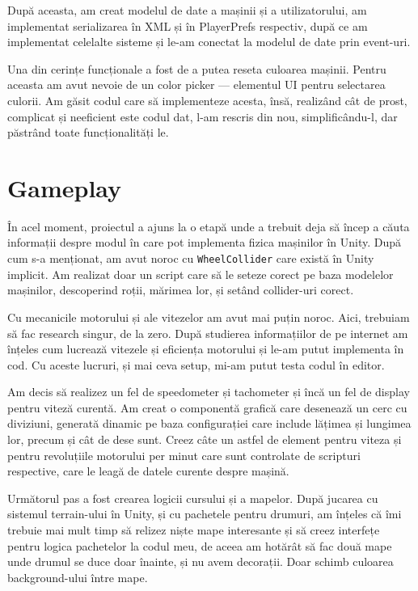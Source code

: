 \documentclass[a4paper,12pt]{report}
\begin{document}
După aceasta, am creat modelul de date a mașinii și a utilizatorului, am implementat serializarea în \ac{XML} și în PlayerPrefs respectiv, după ce am implementat celelalte sisteme și le-am conectat la modelul de date prin event-uri.

Una din cerințe funcționale a fost de a putea reseta culoarea mașinii.
Pentru aceasta am avut nevoie de un color picker --- elementul \ac{UI} pentru selectarea culorii.
Am găsit codul care să implementeze acesta, însă, realizând cât de prost, complicat și neeficient este codul dat, l-am rescris din nou, simplificându-l, dar păstrând toate funcționalități le.



\section{Gameplay}

În acel moment, proiectul a ajuns la o etapă unde a trebuit deja să încep a căuta informații despre modul în care pot implementa fizica mașinilor în Unity.
După cum s-a menționat, am avut noroc cu \texttt{WheelCollider} care există în Unity implicit.
Am realizat doar un script care să le seteze corect pe baza modelelor mașinilor, descoperind roții, mărimea lor, și setând collider-uri corect.

Cu mecanicile motorului și ale vitezelor am avut mai puțin noroc.
Aici, trebuiam să fac research singur, de la zero.
După studierea informațiilor de pe internet am înțeles cum lucrează vitezele și eficiența motorului și le-am putut implementa în cod.
Cu aceste lucruri, și mai ceva setup, mi-am putut testa codul în editor.

Am decis să realizez un fel de speedometer și tachometer și încă un fel de display pentru viteză curentă.
Am creat o componentă grafică care desenează un cerc cu diviziuni, generată dinamic pe baza configurației care include lățimea și lungimea lor, precum și cât de dese sunt.
Creez câte un astfel de element pentru viteza și pentru revoluțiile motorului per minut care sunt controlate de scripturi respective, care le leagă de datele curente despre mașină.

Următorul pas a fost crearea logicii cursului și a mapelor.
După jucarea cu sistemul terrain-ului în Unity, și cu pachetele pentru drumuri, am înțeles că îmi trebuie mai mult timp să relizez niște mape interesante și să creez interfețe pentru logica pachetelor la codul meu, de aceea am hotărât să fac două mape unde drumul se duce doar înainte, și nu avem decorații.
Doar schimb culoarea background-ului între mape.
\end{document}
